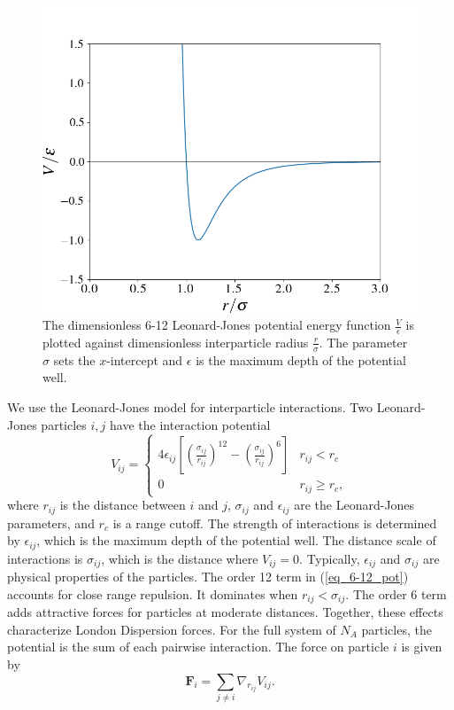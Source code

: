 \documentclass[12pt, reqno]{report}
\theoremstyle{definition}
\theoremstyle{remark}
\begin{document}
\begin{figure}

    \includegraphics[width = .4\paperwidth]{media_paper/gen_lj.png}
    
    \caption{The dimensionless 6-12 Leonard-Jones potential energy function $\frac{V}{\epsilon}$ is plotted against dimensionless interparticle radius $\frac{r}{\sigma}$. The parameter $\sigma$ sets the $x$-intercept and $\epsilon$ is the maximum depth of the potential well.}
    \label{fg_lj_pot}
\end{figure}
We use the Leonard-Jones model for interparticle interactions. 
Two Leonard-Jones particles $i,j$ have the interaction potential
\begin{equation} \label{eq_6-12_pot}
    V_{ij}=
    \begin{cases}
        4\epsilon_{ij}\left[ \left( \frac{\sigma_{ij}}{r_{ij}} \right)^{12}-\left( \frac{\sigma_{ij}}{r_{ij}} \right)^6 \right]&r_{ij}<r_c\\
        0&r_{ij}\ge r_c,
    \end{cases}
\end{equation}
where $r_{ij}$ is the distance between $i$ and $j$, $\sigma_{ij}$ and $\epsilon_{ij}$ are the Leonard-Jones parameters, and $r_c$ is a range cutoff. 
The strength of interactions is determined by $\epsilon_{ij}$, which is the maximum depth of the potential well.
The distance scale of interactions is $\sigma_{ij}$, which is the distance where $V_{ij}=0$. 
Typically, $\epsilon_{ij}$ and $\sigma_{ij}$ are physical properties of the particles.
The order 12 term in (\ref{eq_6-12_pot}) accounts for close range repulsion. 
It dominates when $r_{ij}<\sigma_{ij}$. 
The order 6 term adds attractive forces for particles at moderate distances. 
Together, these effects characterize London Dispersion forces. 
For the full system of $N_A$ particles, the potential is the sum of each pairwise interaction. 
The force on particle $i$ is given by
\begin{equation} \label{eq_MD_force}
    \mathbf{F}_{i}=\sum_{j\ne i}\nabla_{r_{ij}}V_{ij}.
\end{equation}
\end{document}
